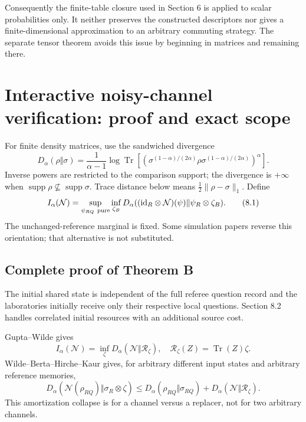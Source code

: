 \documentclass[11pt,reqno]{amsart}
\numberwithin{equation}{section}
\begin{document}
Consequently the finite-table closure used in Section 6 is applied to scalar probabilities only. It neither preserves the constructed descriptors nor gives a finite-dimensional approximation to an arbitrary commuting strategy. The separate tensor theorem avoids this issue by beginning in matrices and remaining there.

\section{Interactive noisy-channel verification: proof and exact scope}\label{interactive-noisy-channel-verification-proof-and-exact-scope}

For finite density matrices, use the sandwiched divergence \[
 D_\alpha(\rho\Vert\sigma)
 =\frac1{\alpha-1}\log\operatorname{Tr}
 [(\sigma^{(1-\alpha)/(2\alpha)}\rho
                 \sigma^{(1-\alpha)/(2\alpha)})^\alpha].
\] Inverse powers are restricted to the comparison support; the divergence is \(+\infty\) when \(\operatorname{supp}\rho\not\subseteq\operatorname{supp}\sigma\). Trace distance below means \(\tfrac12\|\rho-\sigma\|_1\). Define \[
 I_\alpha(\mathcal N)
 =\sup_{\psi_{RQ}\ {\rm pure}}\inf_{\zeta_B}
 D_\alpha(({\rm id}_R\otimes\mathcal N)(\psi)
                         \Vert\psi_R\otimes\zeta_B). \tag{8.1}
\] The unchanged-reference marginal is fixed. Some simulation papers reverse this orientation; that alternative is not substituted.

\subsection{Complete proof of Theorem B}\label{complete-proof-of-theorem-b}

The initial shared state is independent of the full referee question record and the laboratories initially receive only their respective local questions. Section 8.2 handles correlated initial resources with an additional source cost.

Gupta--Wilde \cite[Lemma 5, (5.16), (5.19)--(5.20)]{GW} gives \[
 I_\alpha(\mathcal N)=\inf_\zeta
 D_\alpha(\mathcal N\Vert\mathcal R_\zeta),\quad
 \mathcal R_\zeta(Z)=\operatorname{Tr}(Z)\zeta.
\] Wilde--Berta--Hirche--Kaur \cite[Proposition 41, (283)]{WBHK} gives, for arbitrary different input states and arbitrary reference memories, \[
 D_\alpha(\mathcal N(\rho_{RQ})\Vert\sigma_R\otimes\zeta)
 \le D_\alpha(\rho_{RQ}\Vert\sigma_{RQ})
                  +D_\alpha(\mathcal N\Vert\mathcal R_\zeta).
 \tag{8.2}
\] This amortization collapse is for a channel versus a replacer, not for two arbitrary channels.
\end{document}
